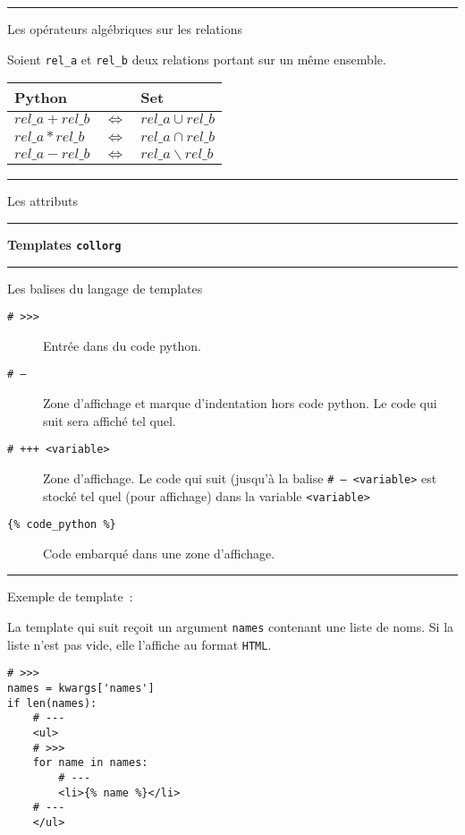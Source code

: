 \documentclass[9pt,a4paper]{letter}
\begin{document}
\begin{multicols}{3}
\rule{0.5cm}{0.1pt} Les opérateurs algébriques sur les relations

Soient \texttt{rel\_a} et \texttt{rel\_b} deux relations portant sur un même ensemble.

\begin{tabular}{|l|l|l|}
\hline
Python & & Set \\
\hline
$rel\_a + rel\_b$ & $\Longleftrightarrow$ & $rel\_a \cup rel\_b$ \\
$rel\_a * rel\_b$ & $\Longleftrightarrow$ & $rel\_a \cap rel\_b$ \\
$rel\_a - rel\_b$ & $\Longleftrightarrow$ & $rel\_a \backslash rel\_b$ \\
\hline
\end{tabular}

\rule{0.5cm}{0.1pt} Les attributs

\rule{0.5cm}{0.1pt} \textbf{\large Templates \texttt{collorg}} \hrulefill

\rule{0.5cm}{0.1pt} Les balises du langage de templates

\begin{description}
\item[\texttt{\# >>>}] Entrée dans du code python.
\item[\texttt{\# ---}] Zone d'affichage et marque d'indentation hors code python. Le code qui suit sera affiché tel quel.
\item[\texttt{\# +++ <variable>}] Zone d'affichage. Le code qui suit (jusqu'à la balise \texttt{\# --- <variable>} est stocké tel quel (pour affichage) dans la variable \texttt{<variable>}
\item[\texttt{\{\% code\_python \%\}}] Code embarqué dans une zone d'affichage.
\end{description}

\rule{0.5cm}{0.1pt} Exemple de template~:

La template qui suit reçoit un argument \texttt{names} contenant une liste de noms. Si la liste n'est pas vide, elle l'affiche au format \texttt{HTML}.
\begin{scriptsize}
\begin{verbatim}
# >>>
names = kwargs['names']
if len(names):
    # ---
    <ul>
    # >>>
    for name in names:
        # ---
        <li>{% name %}</li>
    # ---
    </ul>
\end{verbatim}
\end{scriptsize}

\end{multicols}
\end{document}
